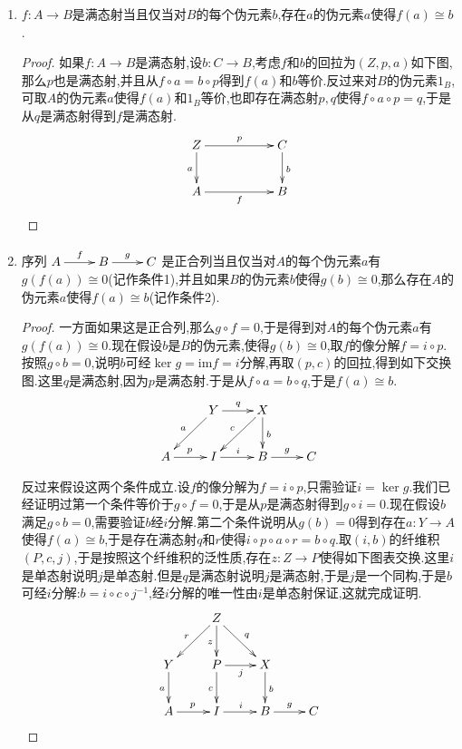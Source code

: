 \begin{enumerate}
\begin{enumerate}
\begin{proof}
        	一方面如果$f$是单态射,自然从$f\circ a=0=f\circ 0$得到$a=0$.反过来如果$f\circ g=0$,此即$f(g)=0$,于是$g=0$.最后假设$f$是单态射,从$f\circ a\circ p=f\circ a'\circ q$得到$a\circ p=a'\circ q$,于是$a\cong a'$.
        \end{proof}
        \item $f:A\to B$是满态射当且仅当对$B$的每个伪元素$b$,存在$a$的伪元素$a$使得$f(a)\cong b$.
        \begin{proof}
        	
        	如果$f:A\to B$是满态射,设$b:C\to B$,考虑$f$和$b$的回拉为$(Z,p,a)$如下图,那么$p$也是满态射,并且从$f\circ a=b\circ p$得到$f(a)$和$b$等价.反过来对$B$的伪元素$1_B$,可取$A$的伪元素$a$使得$f(a)$和$1_B$等价,也即存在满态射$p,q$使得$f\circ a\circ p=q$,于是从$q$是满态射得到$f$是满态射.
        	$$\xymatrix{Z\ar[rr]^p\ar[d]_a&&C\ar[d]^b\\A\ar[rr]_f&&B}$$
        \end{proof}
        \item 序列$\xymatrix{A\ar[r]^f&B\ar[r]^g&C}$是正合列当且仅当对$A$的每个伪元素$a$有$g(f(a))\cong0$(记作条件1),并且如果$B$的伪元素$b$使得$g(b)\cong0$,那么存在$A$的伪元素$a$使得$f(a)\cong b$(记作条件2).
        \begin{proof}
        	
        	一方面如果这是正合列,那么$g\circ f=0$,于是得到对$A$的每个伪元素$a$有$g(f(a))\cong0$.现在假设$b$是$B$的伪元素,使得$g(b)\cong0$,取$f$的像分解$f=i\circ p$.按照$g\circ b=0$,说明$b$可经$\ker g=\mathrm{im}f=i$分解,再取$(p,c)$的回拉,得到如下交换图.这里$q$是满态射,因为$p$是满态射.于是从$f\circ a=b\circ q$,于是$f(a)\cong b$.
        	$$\xymatrix{&Y\ar[dl]_a\ar[r]^q&X\ar[d]^b\ar[dl]_c&\\A\ar[r]^p&I\ar[r]^i&B\ar[r]^g&C}$$
        	
        	反过来假设这两个条件成立.设$f$的像分解为$f=i\circ p$,只需验证$i=\ker g$.我们已经证明过第一个条件等价于$g\circ f=0$,于是从$p$是满态射得到$g\circ i=0$.现在假设$b$满足$g\circ b=0$,需要验证$b$经$i$分解.第二个条件说明从$g(b)=0$得到存在$a:Y\to A$使得$f(a)\cong b$,于是存在满态射$q$和$r$使得$i\circ p\circ a\circ r=b\circ q$.取$(i,b)$的纤维积$(P,c,j)$,于是按照这个纤维积的泛性质,存在$z:Z\to P$使得如下图表交换.这里$i$是单态射说明$j$是单态射.但是$q$是满态射说明$j$是满态射,于是$j$是一个同构,于是$b$可经$i$分解:$b=i\circ c\circ j^{-1}$,经$i$分解的唯一性由$i$是单态射保证,这就完成证明.
        	$$\xymatrix{&Z\ar[dl]_r\ar[d]_z\ar[dr]^q&&\\Y\ar[d]_a&P\ar[r]_j\ar[d]_c&X\ar[d]^b&\\A\ar[r]^p&I\ar[r]^i&B\ar[r]^g&C}$$
        \end{proof}
    \end{enumerate}
\end{enumerate}

